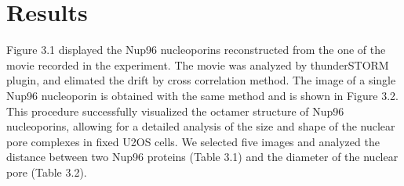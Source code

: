 \documentclass[a4paper,english,12pt,bibliography=totoc]{scrreprt}
\begin{document}
\section{Results}
Figure 3.1 displayed the Nup96 nucleoporins reconstructed from the one of the movie recorded in the experiment. The movie was analyzed by thunderSTORM plugin, and elimated the drift by cross correlation method. The image of a single Nup96 nucleoporin is obtained with the same method and is shown in Figure 3.2. This procedure successfully visualized the octamer structure of Nup96 nucleoporins, allowing for a detailed analysis of the size and shape of the nuclear pore complexes in fixed U2OS cells. We selected five images and analyzed the distance between two Nup96 proteins (Table 3.1) and the diameter of the nuclear pore (Table 3.2).
\end{document}
